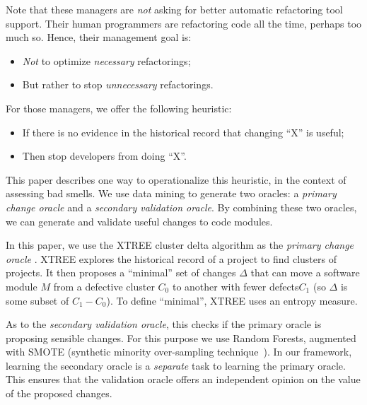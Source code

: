 \documentclass[twocolumn,5p]{elsarticle}
\newcommand{\bi}{\begin{itemize}[leftmargin=0.4cm]}
\newcommand{\ei}{\end{itemize}}
\theoremstyle{break}
\begin{document}
Note that these managers are {\em not} asking for better
automatic refactoring
tool support. Their human programmers are refactoring
code all the time, perhaps too much so.
Hence, their management goal is: 
\bi
\item
{\em Not} to optimize {\em necessary} refactorings;
\item
But rather to stop {\em unnecessary} refactorings.
\ei
For those managers, we offer the  following heuristic:
\bi
\item If there is no evidence in the historical record that changing ``X'' is useful;
\item Then stop developers from doing ``X''.
\ei
This paper describes one way to operationalize this heuristic, in the context
of assessing bad smells. We use data mining to generate two oracles: a {\em primary
change oracle} and a {\em secondary validation oracle}.
By combining these two oracles,
 we can generate and validate useful
changes to code modules.

In this paper, we use 
the XTREE cluster delta algorithm as the {\em primary change  oracle} .
XTREE 
explores the historical record of a project to find clusters of projects.
It then proposes a ``minimal'' set of changes $\Delta$ that can move a software module $M$ from a defective cluster $C_0$ to another with fewer defects$C_1$ (so $\Delta$
is some subset of $C_1 - C_0$). To define ``minimal'', XTREE uses an entropy measure.

As to 
the {\em secondary validation oracle}, this  checks if the primary oracle is proposing
sensible changes. For this purpose we  use Random Forests\cite{XXX}, augmented with SMOTE (synthetic  minority over-sampling technique~\cite{YYY}).
 In our framework,  learning
the secondary oracle is   a {\em separate} task to learning the primary
oracle. This  ensures that the validation oracle offers an independent
opinion on the value of the proposed changes.
\end{document}
